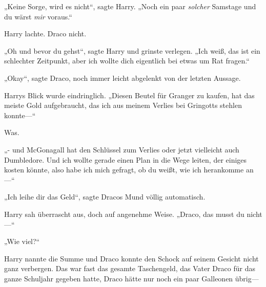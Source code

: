 „Keine Sorge, wird es nicht“, sagte Harry. „Noch ein paar \emph{solcher} Samstage und du wärst \emph{mir} voraus.“

Harry lachte. Draco nicht.

„Oh und bevor du gehst“, sagte Harry und grinste verlegen. „Ich weiß, das ist ein schlechter Zeitpunkt, aber ich wollte dich eigentlich bei etwas um Rat fragen.“

„Okay“, sagte Draco, noch immer leicht abgelenkt von der letzten Aussage.

Harrys Blick wurde eindringlich. „Diesen Beutel für Granger zu kaufen, hat das meiste Gold aufgebraucht, das ich aus meinem Verlies bei Gringotts stehlen konnte—“

Was.

„- und McGonagall hat den Schlüssel zum Verlies oder jetzt vielleicht auch Dumbledore. Und ich wollte gerade einen Plan in die Wege leiten, der einiges kosten könnte, also habe ich mich gefragt, ob du weißt, wie ich herankomme an—“

„Ich leihe dir das Geld“, sagte Dracos Mund völlig automatisch.

Harry sah überrascht aus, doch auf angenehme Weise. „Draco, das musst du nicht—“

„Wie viel?“

Harry nannte die Summe und Draco konnte den Schock auf seinem Gesicht nicht ganz verbergen. Das war fast das gesamte Taschengeld, das Vater Draco für das ganze Schuljahr gegeben hatte, Draco hätte nur noch ein paar Galleonen übrig—


